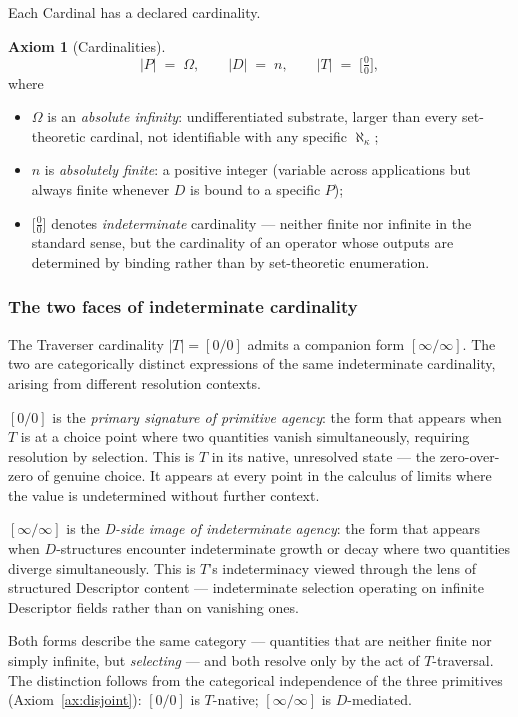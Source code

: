 \documentclass[11pt,a4paper]{article}
\theoremstyle{definition}
\newtheorem{axiom}[theorem]{Axiom}
\theoremstyle{remark}
\begin{document}
Each Cardinal has a declared cardinality.

\begin{axiom}[Cardinalities]\label{ax:cardinalities}
\[
|P| \;=\; \Omega, \qquad |D| \;=\; n, \qquad |T| \;=\; \bigl[\tfrac{0}{0}\bigr],
\]
where
\begin{itemize}[leftmargin=*]
\item $\Omega$ is an \emph{absolute infinity}: undifferentiated substrate, larger than every set-theoretic cardinal, not identifiable with any specific $\aleph_{\kappa}$;
\item $n$ is \emph{absolutely finite}: a positive integer (variable across applications but always finite whenever $D$ is bound to a specific $P$);
\item $\bigl[\tfrac{0}{0}\bigr]$ denotes \emph{indeterminate} cardinality --- neither finite nor infinite in the standard sense, but the cardinality of an operator whose outputs are determined by binding rather than by set-theoretic enumeration.
\end{itemize}
\end{axiom}

\subsubsection{The two faces of indeterminate cardinality}\label{subsubsec:two-indeterminate}

The Traverser cardinality $|T| = [0/0]$ admits a companion form $[\infty/\infty]$. The two are categorically distinct expressions of the same indeterminate cardinality, arising from different resolution contexts.

$[0/0]$ is the \emph{primary signature of primitive agency}: the form that appears when $T$ is at a choice point where two quantities vanish simultaneously, requiring resolution by selection. This is $T$ in its native, unresolved state --- the zero-over-zero of genuine choice. It appears at every point in the calculus of limits where the value is undetermined without further context.

$[\infty/\infty]$ is the \emph{D-side image of indeterminate agency}: the form that appears when $D$-structures encounter indeterminate growth or decay where two quantities diverge simultaneously. This is $T$'s indeterminacy viewed through the lens of structured Descriptor content --- indeterminate selection operating on infinite Descriptor fields rather than on vanishing ones.

Both forms describe the same category --- quantities that are neither finite nor simply infinite, but \emph{selecting} --- and both resolve only by the act of $T$-traversal. The distinction follows from the categorical independence of the three primitives (Axiom~\ref{ax:disjoint}): $[0/0]$ is $T$-native; $[\infty/\infty]$ is $D$-mediated.
\end{document}
